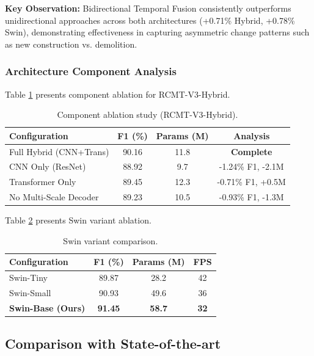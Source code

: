 \documentclass[journal]{IEEEtran}
\begin{document}
\textbf{Key Observation:} Bidirectional Temporal Fusion consistently outperforms unidirectional approaches across both architectures (+0.71\% Hybrid, +0.78\% Swin), demonstrating effectiveness in capturing asymmetric change patterns such as new construction vs. demolition.

\subsubsection{Architecture Component Analysis}

Table \ref{tab:arch_hybrid} presents component ablation for RCMT-V3-Hybrid.

\begin{table}[ht]
\centering
\caption{Component ablation study (RCMT-V3-Hybrid).}
\label{tab:arch_hybrid}
\begin{tabular}{lccc}
\toprule
\textbf{Configuration} & \textbf{F1 (\%)} & \textbf{Params (M)} & \textbf{Analysis} \\
\midrule
    Full Hybrid (CNN+Trans) & 90.16 & 11.8 & \textbf{Complete} \\
    CNN Only (ResNet) & 88.92 & 9.7 & -1.24\% F1, -2.1M \\
    Transformer Only & 89.45 & 12.3 & -0.71\% F1, +0.5M \\
    No Multi-Scale Decoder & 89.23 & 10.5 & -0.93\% F1, -1.3M \\
\bottomrule
\end{tabular}
\end{table}

Table \ref{tab:swin_variants} presents Swin variant ablation.

\begin{table}[ht]
\centering
\caption{Swin variant comparison.}
\label{tab:swin_variants}
\begin{tabular}{lccc}
\toprule
\textbf{Configuration} & \textbf{F1 (\%)} & \textbf{Params (M)} & \textbf{FPS} \\
\midrule
    Swin-Tiny & 89.87 & 28.2 & 42 \\
    Swin-Small & 90.93 & 49.6 & 36 \\
    \textbf{Swin-Base (Ours)} & \textbf{91.45} & \textbf{58.7} & \textbf{32} \\
\bottomrule
\end{tabular}
\end{table}

\subsection{Comparison with State-of-the-art}
\end{document}
